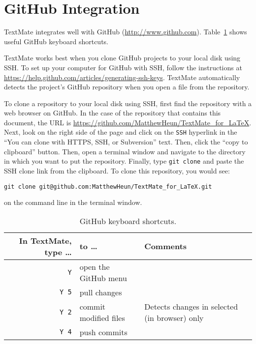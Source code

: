 \documentclass[10pt]{article}
\begin{document}


\section{GitHub Integration} %
\label{sec:github_integration}

TextMate integrates well with GitHub (\url{http://www.github.com}). 
Table~\ref{tab:github_keyboard_shortcuts} shows useful GitHub keyboard shortcuts.

TextMate works best when you clone GitHub projects to your local disk using SSH. 
To set up your computer for GitHub with SSH, follow the instructions at
\url{https://help.github.com/articles/generating-ssh-keys}. 
TextMate automatically detects the project's GitHub repository 
when you open a file from the repository.

To clone a repository to your local disk using SSH, 
first find the repository with a web browser on GitHub.
In the case of the repository that contains this document, 
the URL is \url{https://github.com/MatthewHeun/TextMate_for_LaTeX}. 
Next, look on the right side of the page and click on 
the \texttt{SSH} hyperlink in the 
``You can clone with HTTPS, SSH, or Subversion'' text.
Then, click the ``copy to clipboard'' button.
Then, open a terminal window and navigate to the directory in which you want to 
put the repository.
Finally, type \texttt{git clone} and paste the SSH clone link from the clipboard.
To clone this repository, you would see:

\verb!git clone git@github.com:MatthewHeun/TextMate_for_LaTeX.git!

\noindent on the command line in the terminal window.

\begin{table}
\centering
\caption{GitHub keyboard shortcuts.}
\begin{tabular}{r|l|l}
	In TextMate, type \dots & to \dots      & Comments                                       \\
	\hline
	\cmdkey\texttt{Y}           & open the GitHub menu            &                          \\
	\cmdkey\texttt{Y 5}         & pull changes                    &                          \\
	\cmdkey\texttt{Y 2}         & commit modified files           & Detects changes in selected (in browser) only \\
	\cmdkey\texttt{Y 4}         & push commits                    &                          \\
\end{tabular}
\label{tab:github_keyboard_shortcuts}
\end{table}
\end{document}

